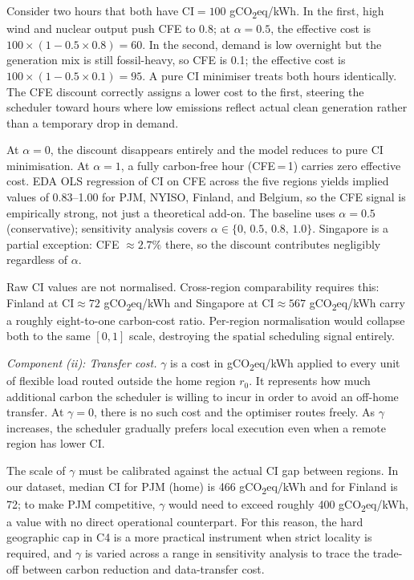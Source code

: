 \documentclass[11pt, a4paper]{article}
\begin{document}
Consider two hours that both have $\text{CI} = 100$ gCO\textsubscript{2}eq/kWh. In the first, high wind and nuclear output push CFE to 0.8; at $\alpha = 0.5$, the effective cost is $100 \times (1 - 0.5 \times 0.8) = 60$. In the second, demand is low overnight but the generation mix is still fossil-heavy, so CFE is 0.1; the effective cost is $100 \times (1 - 0.5 \times 0.1) = 95$. A pure CI minimiser treats both hours identically. The CFE discount correctly assigns a lower cost to the first, steering the scheduler toward hours where low emissions reflect actual clean generation rather than a temporary drop in demand.

At $\alpha = 0$, the discount disappears entirely and the model reduces to pure CI minimisation. At $\alpha = 1$, a fully carbon-free hour (CFE\,=\,1) carries zero effective cost. EDA OLS regression of CI on CFE across the five regions yields implied values of 0.83--1.00 for PJM, NYISO, Finland, and Belgium, so the CFE signal is empirically strong, not just a theoretical add-on. The baseline uses $\alpha = 0.5$ (conservative); sensitivity analysis covers $\alpha \in \{0,\,0.5,\,0.8,\,1.0\}$. Singapore is a partial exception: CFE $\approx 2.7\%$ there, so the discount contributes negligibly regardless of $\alpha$.

Raw CI values are not normalised. Cross-region comparability requires this: Finland at $\text{CI} \approx 72$ gCO\textsubscript{2}eq/kWh and Singapore at $\text{CI} \approx 567$ gCO\textsubscript{2}eq/kWh carry a roughly eight-to-one carbon-cost ratio. Per-region normalisation would collapse both to the same $[0,1]$ scale, destroying the spatial scheduling signal entirely.

\textit{Component (ii): Transfer cost.}
$\gamma$ is a cost in gCO\textsubscript{2}eq/kWh applied to every unit of flexible load routed outside the home region $r_0$. It represents how much additional carbon the scheduler is willing to incur in order to avoid an off-home transfer. At $\gamma = 0$, there is no such cost and the optimiser routes freely. As $\gamma$ increases, the scheduler gradually prefers local execution even when a remote region has lower CI.

The scale of $\gamma$ must be calibrated against the actual CI gap between regions. In our dataset, median CI for PJM (home) is 466 gCO\textsubscript{2}eq/kWh and for Finland is 72; to make PJM competitive, $\gamma$ would need to exceed roughly 400 gCO\textsubscript{2}eq/kWh, a value with no direct operational counterpart. For this reason, the hard geographic cap in C4 is a more practical instrument when strict locality is required, and $\gamma$ is varied across a range in sensitivity analysis to trace the trade-off between carbon reduction and data-transfer cost.
\end{document}
